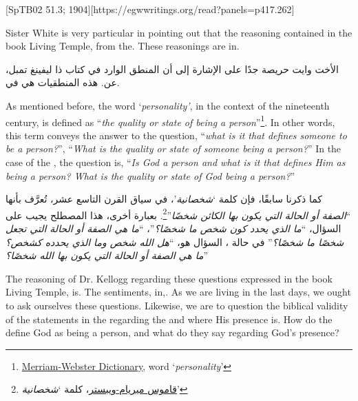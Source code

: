 [SpTB02 51.3; 1904][https://egwwritings.org/read?panels=p417.262]


Sister White is very particular in pointing out that the reasoning contained in the book Living Temple, from the. These reasonings are in.


الأخت وايت حريصة جدًا على الإشارة إلى أن المنطق الوارد في كتاب ذا ليفينغ تمبل، عن. هذه المنطقيات هي في.


As mentioned before, the word ‘\textit{personality’}, in the context of the nineteenth century, is defined as “\textit{the quality or state of being a person}”\footnote{\href{https://www.merriam-webster.com/dictionary/personality}{Merriam-Webster Dictionary}, word ‘\textit{personality}’}. In other words, this term conveys the answer to the question, “\textit{what is it that defines someone to be a person?}”, “\textit{What is the quality or state of someone being a person?}” In the case of the , the question is, “\textit{Is God a person and what is it that defines Him as being a person? What is the quality or state of God being a person?}”


كما ذكرنا سابقًا، فإن كلمة ‘\textit{شخصانية}’، في سياق القرن التاسع عشر، تُعرَّف بأنها “\textit{الصفة أو الحالة التي يكون بها الكائن شخصًا}”\footnote{\href{https://www.merriam-webster.com/dictionary/personality}{قاموس ميريام-ويبستر}، كلمة ‘\textit{شخصانية}’}. بعبارة أخرى، هذا المصطلح يجيب على السؤال، “\textit{ما الذي يحدد كون شخص ما شخصًا؟}”، “\textit{ما هي الصفة أو الحالة التي تجعل شخصًا ما شخصًا؟}” في حالة ، السؤال هو، “\textit{هل الله شخص وما الذي يحدده كشخص؟ ما هي الصفة أو الحالة التي يكون بها الله شخصًا؟}”


The reasoning of Dr. Kellogg regarding these questions expressed in the book Living Temple, is. The sentiments, in,. As we are living in the last days, we ought to ask ourselves these questions. Likewise, we are to question the biblical validity of the statements in the  regarding the  and where His presence is. How do the  define God as being a person, and what do they say regarding God’s presence?


